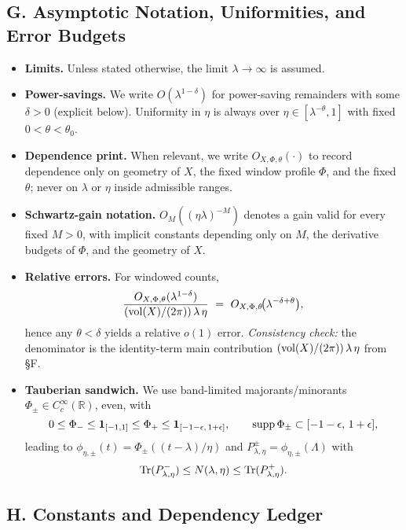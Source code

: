\subsection*{G. Asymptotic Notation, Uniformities, and Error Budgets}

\begin{itemize}
  \item \textbf{Limits.} Unless stated otherwise, the limit $\lambda\to\infty$ is assumed.
  \item \textbf{Power-savings.} We write $O(\lambda^{1-\delta})$ for power-saving remainders with some $\delta>0$ (explicit below).
        Uniformity in $\eta$ is always over $\eta\in[\lambda^{-\theta},1]$ with fixed $0<\theta<\theta_0$.
  \item \textbf{Dependence print.} When relevant, we write $O_{X,\Phi,\theta}(\cdot)$ to record dependence only on geometry of $X$, the fixed window profile $\Phi$, and the fixed $\theta$; never on $\lambda$ or $\eta$ inside admissible ranges.
  \item \textbf{Schwartz-gain notation.} $O_M((\eta\lambda)^{-M})$ denotes a gain valid for every fixed $M>0$, with implicit constants depending only on $M$, the derivative budgets of $\Phi$, and the geometry of $X$.
  \item \textbf{Relative errors.} For windowed counts,
        \[
          \frac{O_{X,\Phi,\theta}(\lambda^{1-\delta})}{(\vol(X)/(2\pi))\,\lambda\,\eta}
          \ =\ O_{X,\Phi,\theta}\!\big(\lambda^{-\delta+\theta}\big),
        \]
        hence any $\theta<\delta$ yields a relative $o(1)$ error.
        \emph{Consistency check:} the denominator is the identity-term main contribution $(\operatorname{vol}(X)/(2\pi))\,\lambda\,\eta$ from \S F.
  \item \textbf{Tauberian sandwich.} We use band-limited majorants/minorants $\Phi_\pm\in C_c^\infty(\mathbb{R})$, even, with
        \[
          0\le\Phi_-\le\mathbf{1}_{[-1,1]}\le\Phi_+\le\mathbf{1}_{[-1-\epsilon,\,1+\epsilon]},
          \qquad \operatorname{supp}\Phi_\pm\subset[-1-\epsilon,\,1+\epsilon],
        \]
        leading to $\phi_{\eta,\pm}(t)=\Phi_\pm((t-\lambda)/\eta)$ and $P^\pm_{\lambda,\eta}=\phi_{\eta,\pm}(\Lambda)$ with
        \[
          \operatorname{Tr}(P^-_{\lambda,\eta})\le N(\lambda,\eta)\le \operatorname{Tr}(P^+_{\lambda,\eta}).
        \]
\end{itemize}

\subsection*{H. Constants and Dependency Ledger}

